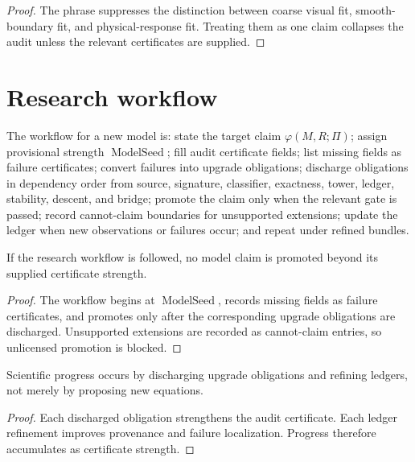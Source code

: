 \begin{proof}
The phrase suppresses the distinction between coarse visual fit, smooth-boundary fit, and physical-response fit. Treating them as one claim collapses the audit unless the relevant certificates are supplied.
\end{proof}

\section{Research workflow}
\label{sec:model-audit-research-workflow}

\begin{definition}
\label{def:research-workflow-new-model}
The workflow for a new model is: state the target claim $\varphi(M,R;\Pi)$; assign provisional strength $\operatorname{ModelSeed}$; fill audit certificate fields; list missing fields as failure certificates; convert failures into upgrade obligations; discharge obligations in dependency order from source, signature, classifier, exactness, tower, ledger, stability, descent, and bridge; promote the claim only when the relevant gate is passed; record cannot-claim boundaries for unsupported extensions; update the ledger when new observations or failures occur; and repeat under refined bundles.
\end{definition}

\begin{theorem}
\label{thm:workflow-prevents-unlicensed-promotion}
If the research workflow is followed, no model claim is promoted beyond its supplied certificate strength.
\end{theorem}

\begin{proof}
The workflow begins at $\operatorname{ModelSeed}$, records missing fields as failure certificates, and promotes only after the corresponding upgrade obligations are discharged. Unsupported extensions are recorded as cannot-claim entries, so unlicensed promotion is blocked.
\end{proof}

\begin{corollary}
\label{cor:progress-obligation-discharge}
Scientific progress occurs by discharging upgrade obligations and refining ledgers, not merely by proposing new equations.
\end{corollary}

\begin{proof}
Each discharged obligation strengthens the audit certificate. Each ledger refinement improves provenance and failure localization. Progress therefore accumulates as certificate strength.
\end{proof}

